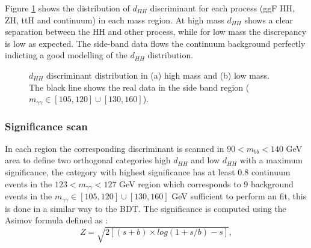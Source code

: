 Figure \ref{fig:HHyybb:ObjEvt:DNN:dHH} shows the distribution of $d_{HH}$ discriminant for each process (ggF HH, ZH, ttH and continuum) in each mass region. At high mass $d_{HH}$ shows a clear separation between the HH and other process, while for low mass the discrepancy is low as expected. The side-band data flows the continuum background perfectly indicting a good modelling of the $d_{HH}$ distribution. 
\begin{figure}[ht]
    \centering
    \caption{$d_{HH}$ discriminant distribution in (a) high mass and (b) low mass. The black line shows the real data in the side band region ($m_{\gamma\gamma}\in[105,120] \cup [130,160]$).}
    \label{fig:HHyybb:ObjEvt:DNN:dHH}
\end{figure}

\subsubsection{Significance scan}
In each region the corresponding discriminant is scanned in $90<m_{bb}<140$ GeV area to define two orthogonal categories high $d_{HH}$ and low $d_{HH}$ with a maximum significance, the category with highest significance has at least 0.8 continuum events in the $123<m_{\gamma\gamma}<127$ GeV region which corresponds to 9 background events in the $m_{\gamma\gamma}\in[105,120] \cup [130,160]$ GeV sufficient to perform an \myy fit, this is done in a similar way to the BDT. The significance is computed using the Asimov formula \cite{Z} defined as : 
\begin{equation}
    Z = \sqrt{2\left[(s+b)\times log(1+s/b)-s\right]},
\end{equation}

